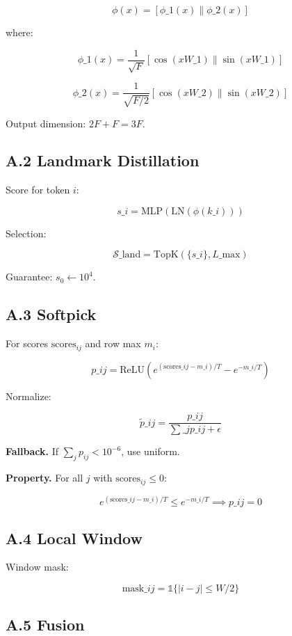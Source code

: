 \[
\phi(x) = [\phi\_1(x) \| \phi\_2(x)]
\tag{A.2}
\]

where:

\[
\phi\_1(x) = \frac{1}{\sqrt{F}} [\cos(xW\_1) \| \sin(xW\_1)]
\tag{A.3}
\]

\[
\phi\_2(x) = \frac{1}{\sqrt{F/2}} [\cos(xW\_2) \| \sin(xW\_2)]
\tag{A.4}
\]

Output dimension: $2F + F = 3F$.

\subsection{A.2 Landmark Distillation}

Score for token $i$:

\[
s\_i = \text{MLP}(\text{LN}(\phi(k\_i)))
\tag{A.5}
\]

Selection:

\[
\mathcal{S}\_\text{land} = \text{TopK}(\{s\_i\}, L\_\text{max})
\tag{A.6}
\]

Guarantee: $s_0 \leftarrow 10^4$.

\subsection{A.3 Softpick}

For scores $\text{scores}_{ij}$ and row max $m_i$:

\[
p\_{ij} = \text{ReLU}\!\left(e^{(\text{scores}\_{ij} - m\_i)/T} - e^{-m\_i/T}\right)
\tag{A.7}
\]

Normalize:

\[
\tilde{p}\_{ij} = \frac{p\_{ij}}{\sum\_j p\_{ij} + \epsilon}
\tag{A.8}
\]

\textbf{Fallback.} If $\sum_j p_{ij} < 10^{-6}$, use uniform.

\textbf{Property.} For all $j$ with $\text{scores}_{ij} \leq 0$:

\[
e^{(\text{scores}\_{ij} - m\_i)/T} \leq e^{-m\_i/T} \implies p\_{ij} = 0
\tag{A.9}
\]

\subsection{A.4 Local Window}

Window mask:

\[
\text{mask}\_{ij} = \mathbb{1}\{|i - j| \leq W/2\}
\tag{A.10}
\]

\subsection{A.5 Fusion}

